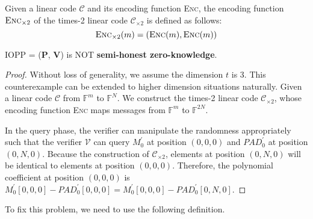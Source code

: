 \begin{definition}
 Given a linear code $\mathcal{C}$ and its encoding function \textsc{Enc}, the encoding function $\textsc{Enc}_{\times 2}$ of the times-2 linear code $\mathcal{C}_{\times 2}$ is defined as follows:
 $$
    \textsc{Enc}_{\times 2} (m) = (\textsc{Enc}(m), \textsc{Enc}(m))
 $$
\end{definition}



\begin{lemma}
\label{lemma:szkpc-zk-cexample}

IOPP = ($\textbf{P}$, $\textbf{V}$) is NOT \textbf{semi-honest zero-knowledge}.

\end{lemma}
\begin{proof}

Without loss of generality, we assume the dimension $t$ is 3. This counterexample can be extended to higher dimension situations naturally. Given a linear code $\mathcal{C}$ from $\mathbb{F}^m$ to $\mathbb{F}^N$. We construct the times-2 linear code $\mathcal{C}_{\times 2}$, whose encoding function \textsc{Enc} maps messages from $\mathbb{F}^m$ to $\mathbb{F}^{2N}$.

In the query phase, the verifier can manipulate the randomness appropriately such that the verifier $\mathcal{V}$ can query $M_0^\prime$ at position $(0, 0, 0)$ and $PAD_0^\prime$ at position $(0, N, 0)$.
Because the construction of $\mathcal{C}_{\times 2}$, elements at position $(0, N, 0)$ will be identical to elements at position $(0, 0, 0)$. 
Therefore, the polynomial coefficient at position $(0, 0, 0)$ is $M_0^\prime[0, 0, 0] - PAD_0^\prime[0, 0, 0] = M_0^\prime[0, 0, 0] - PAD_0^\prime[0, N, 0]$.
\end{proof}









To fix this problem, we need to use the following definition.

